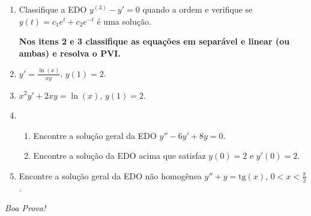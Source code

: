\documentclass[a4paper,5pt]{amsbook}
\newcommand{\ds}{\displaystyle}
\begin{document}
\vspace{0.2cm}
\begin{enumerate}

\item Classifique a EDO $y^{(3)} - y' = 0$ quando a ordem e verifique se $y(t) =
	c_1 e^t + c_2 e^{-t}$ \'e uma solu\c{c}\~ao.
\vspace{0.8cm}

\noindent{}\textbf{Nos itens 2 e 3 classifique as equa\c{c}\~oes em separ\'avel e linear (ou ambas) e resolva o PVI.}
\vspace{0.2cm}

\item $\ds y' = \frac{\ln(x)}{xy}$, $y(1)=2$.
\vspace{1cm}

\item $x^2y' + 2xy = \ln(x)$, $y(1)=2$.
\vspace{1cm}

\item
	\begin{enumerate}
		\item Encontre a solu\c{c}\~ao geral da EDO $y''-6y'+8y=0$.
		\item Encontre a solu\c{c}\~ao da EDO acima que satisfaz $y(0)=2$ e
			$y'(0)=2$.
	\end{enumerate}
\vspace{1cm}

\item Encontre a solu\c{c}\~ao geral da EDO n\~ao homog\^enea $y''+y = \text{tg}(x)$,
	$0<x<\frac{\pi}{2}$.

\end{enumerate}

\begin{flushright}
	\textit{Boa Prova!}
\end{flushright}
\end{document}
